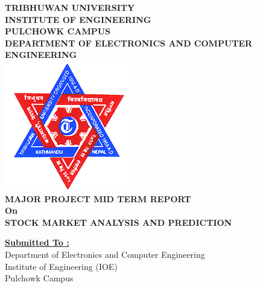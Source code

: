 

\thispagestyle{empty} %

\begin{titlepage}
\newcommand{\HRule}{\rule{\linewidth}{0.2mm}} %

\center %

\textbf{\huge TRIBHUWAN UNIVERSITY}\\[0.5cm] %
\textbf{\Large INSTITUTE OF ENGINEERING}\\[0.5cm] %
\textbf{\Large PULCHOWK CAMPUS}\\[1.0cm] %
\textbf{\large DEPARTMENT OF ELECTRONICS AND COMPUTER ENGINEERING}\\
\includegraphics{fig/ioe-logo.png}\\[0.2cm] %

\textbf{MAJOR PROJECT MID TERM REPORT \\ On}\\[0.5cm]

{\textbf{\large STOCK MARKET  ANALYSIS AND PREDICTION}  }\\[1.0cm] %


	\begin{center}
		\textbf {\underline {Submitted To :}}\\
		\textsf{Department of Electronics and Computer Engineering\\
				Institute of Engineering (IOE)\\
				Pulchowk Campus\\[0.2cm]}	
	

\end{center}
\end{titlepage}
